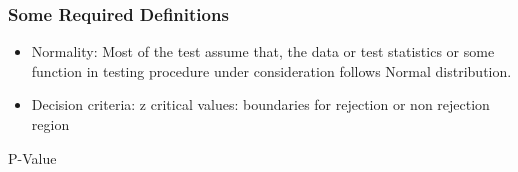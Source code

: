 

\begin{frame}[fragile]\frametitle{Some Required Definitions}
\begin{itemize}
\item Normality: Most of the test assume that, the data or test statistics 
or some function in testing procedure under consideration follows 
Normal distribution. 
 
\item Decision  criteria: z critical values:  boundaries for rejection or non rejection region
\end{itemize}
\end{frame}

\begin{frame}
\begin{center}
{\Large P-Value}
\end{center}
\end{frame}



